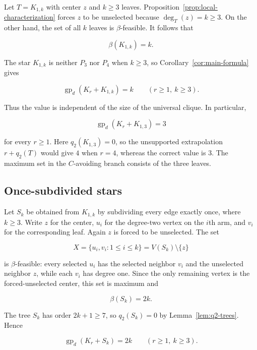 \documentclass[preprint,12pt]{elsarticle}
\numberwithin{equation}{section}
\begin{document}
Let \(T=K_{1,k}\) with center \(z\) and \(k\ge 3\) leaves.
Proposition~\ref{prop:local-characterization} forces \(z\) to be
unselected because \(\deg_T(z)=k\ge 3\). On the
other hand, the set of all \(k\) leaves is \(\beta\)-feasible. It
follows that

\[
\beta(K_{1,k})=k.
\]

The star \(K_{1,k}\) is neither \(P_3\) nor \(P_4\) when \(k\ge 3\), so
Corollary~\ref{cor:main-formula} gives

\begin{equation}\label{eq:star-family}
\operatorname{gp}_d(K_r+K_{1,k})=k
\qquad (r\ge 1,\ k\ge 3).
\end{equation}

Thus the value is independent of the size of the universal clique. In
particular,

\[
\operatorname{gp}_d(K_r+K_{1,3})=3
\]

for every \(r\ge 1\). Here \(q_2(K_{1,3})=0\), so the unsupported extrapolation
\(r+q_2(T)\) would give \(4\) when \(r=4\), whereas the correct value is
\(3\). The maximum set in the \(C\)-avoiding branch consists of the three
leaves.

\subsection{Once-subdivided stars}\label{sec:subdivided-stars}

Let \(S_k\) be obtained from \(K_{1,k}\) by subdividing every edge
exactly once, where \(k\ge 3\). Write \(z\) for the center, \(u_i\) for
the degree-two vertex on the \(i\)th arm, and \(v_i\) for the
corresponding leaf. Again \(z\) is forced to be unselected. The set

\[
X=\{u_i,v_i:1\le i\le k\}=V(S_k)\setminus\{z\}
\]

is \(\beta\)-feasible: every selected \(u_i\) has the selected neighbor
\(v_i\) and the unselected neighbor \(z\), while each \(v_i\) has degree
one. Since the only remaining vertex is the forced-unselected center,
this set is maximum and

\[
\beta(S_k)=2k.
\]

The tree \(S_k\) has order \(2k+1\ge 7\), so \(q_2(S_k)=0\) by
Lemma~\ref{lem:q2-trees}. Hence

\begin{equation}\label{eq:subdivided-star-family}
\operatorname{gp}_d(K_r+S_k)=2k
\qquad (r\ge 1,\ k\ge 3).
\end{equation}
\end{document}
